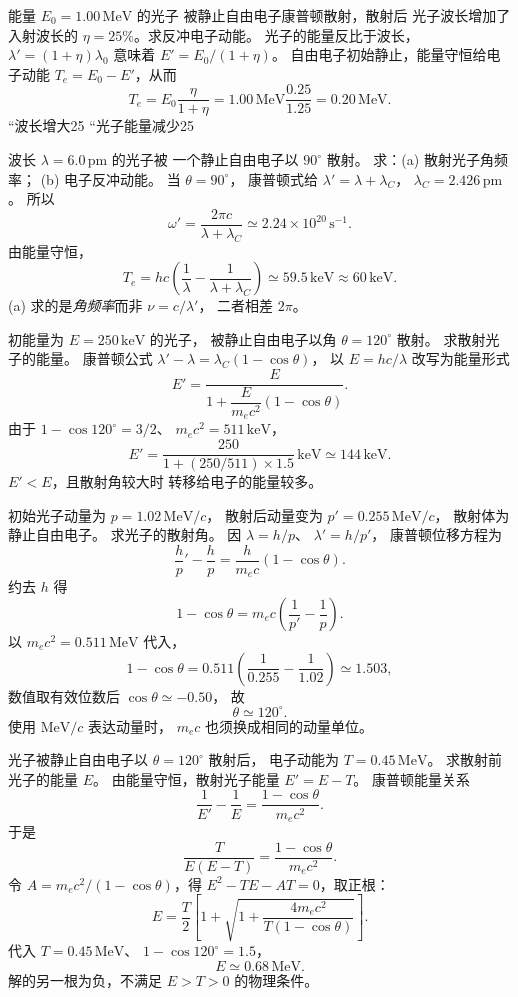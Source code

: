 能量 $E_0=1.00\,\mathrm{MeV}$ 的光子
被静止自由电子康普顿散射，散射后
光子波长增加了入射波长的
$\eta=25\%$。求反冲电子动能。
\exsolution
光子的能量反比于波长，
$\lambda'=(1+\eta)\lambda_0$ 意味着
$E'=E_0/(1+\eta)$。
自由电子初始静止，能量守恒给电子动能
$T_e=E_0-E'$，从而
\[
 \boxed{T_e=E_0\frac{\eta}{1+\eta}
 =1.00\,\mathrm{MeV}\frac{0.25}{1.25}
 =0.20\,\mathrm{MeV}}.
\]
\excheck “波长增大25%
“光子能量减少25%

波长 $\lambda=6.0\,\mathrm{pm}$ 的光子被
一个静止自由电子以 $90^\circ$ 散射。
求：(a) 散射光子角频率；
(b) 电子反冲动能。
\exsolution
当 $\theta=90^\circ$，
康普顿式给 $\lambda'=\lambda+\lambda_C$，
$\lambda_C=2.426\,\mathrm{pm}$。
所以
\[
 \boxed{\omega'=\frac{2\pi c}{\lambda+\lambda_C}
 \simeq2.24\times10^{20}\,\mathrm{s^{-1}}}.
\]
由能量守恒，
\[
 \boxed{T_e=hc\left(\frac1\lambda-
 \frac1{\lambda+\lambda_C}\right)
 \simeq59.5\,\mathrm{keV}\approx60\,\mathrm{keV}}.
\]
\excheck (a) 求的是\emph{角频率}而非 $\nu=c/\lambda'$，
二者相差 $2\pi$。

初能量为 $E=250\,\mathrm{keV}$ 的光子，
被静止自由电子以角 $\theta=120^\circ$ 散射。
求散射光子的能量。
\exsolution
康普顿公式
$\lambda'-\lambda=\lambda_C(1-\cos\theta)$，
以 $E=hc/\lambda$ 改写为能量形式
\[
 E'=\frac E{1+
 \dfrac E{m_ec^2}(1-\cos\theta)}.
\]
由于
$1-\cos120^\circ=3/2$、
$m_ec^2=511\,\mathrm{keV}$，
\[
 \boxed{E'=
 \frac{250}{1+(250/511)\times1.5}\,\mathrm{keV}
 \simeq144\,\mathrm{keV}}.
\]
\excheck $E'<E$，且散射角较大时
转移给电子的能量较多。

初始光子动量为
$p=1.02\,\mathrm{MeV}/c$，
散射后动量变为
$p'=0.255\,\mathrm{MeV}/c$，
散射体为静止自由电子。
求光子的散射角。
\exsolution
因 $\lambda=h/p$、
$\lambda'=h/p'$，
康普顿位移方程为
\[
 \frac hp'-\frac hp=
 \frac h{m_ec}(1-\cos\theta).
\]
约去 $h$ 得
\[
 \boxed{1-\cos\theta=
 m_ec\left(\frac1{p'}-\frac1p\right)}.
\]
以 $m_ec^2=0.511\,\mathrm{MeV}$ 代入，
\[
 1-\cos\theta=
 0.511\left(\frac1{0.255}-\frac1{1.02}\right)
 \simeq1.503,
\]
数值取有效位数后 $\cos\theta\simeq-0.50$，
故
\[
 \boxed{\theta\simeq120^\circ}.
\]
\excheck 使用 $\mathrm{MeV}/c$ 表达动量时，
$m_ec$ 也须换成相同的动量单位。

光子被静止自由电子以
$\theta=120^\circ$ 散射后，
电子动能为 $T=0.45\,\mathrm{MeV}$。
求散射前光子的能量 $E$。
\exsolution
由能量守恒，散射光子能量 $E'=E-T$。
康普顿能量关系
\[
 \frac1{E'}-\frac1E=
 \frac{1-\cos\theta}{m_ec^2}.
\]
于是
\[
 \frac{T}{E(E-T)}
 =\frac{1-\cos\theta}{m_ec^2}.
\]
令 $A=m_ec^2/(1-\cos\theta)$，得
$E^2-TE-AT=0$，取正根：
\[
 \boxed{E=\frac T2
 \left[1+\sqrt{1+
 \frac{4m_ec^2}{T(1-\cos\theta)}}\right]}.
\]
代入 $T=0.45\,\mathrm{MeV}$、
$1-\cos120^\circ=1.5$，
\[
 \boxed{E\simeq0.68\,\mathrm{MeV}}.
\]
\excheck 解的另一根为负，不满足
$E>T>0$ 的物理条件。

